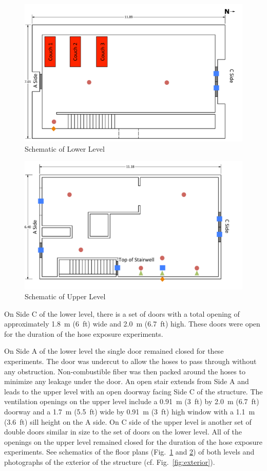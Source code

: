 \documentclass[letterpaper,11pt]{texMemo} %
\begin{document}
\begin{figure}[!ht]
\centering
\includegraphics[width=0.8\columnwidth]{../Figures/Hose_Figures/schematic_lower}
\caption{Schematic of Lower Level}
\label{fig:schematic_low}
\end{figure}

\begin{figure}[!ht]
\centering
\includegraphics[width=0.8\columnwidth]{../Figures/Hose_Figures/schematic_upper}
\caption{Schematic of Upper Level}
\label{fig:schematic_up}
\end{figure}

On Side C of the lower level, there is a set of doors with a total opening of approximately 1.8~m (6~ft) wide and 2.0~m (6.7~ft) high. These doors were open for the duration of the hose exposure experiments.  

On Side A of the lower level the single door remained closed for these experiments. The door was undercut to allow the hoses to pass through without any obstruction. Non-combustible fiber was then packed around the hoses to minimize any leakage under the door.  An open stair extends from Side A and leads to the upper level with an open doorway facing Side C of the structure. The ventilation openings on the upper level include a 0.91~m (3~ft) by 2.0~m (6.7~ft) doorway and a 1.7~m (5.5~ft) wide by 0.91~m (3~ft) high window with a 1.1~m (3.6~ft) sill height on the A side. On C side of the upper level is another set of double doors similar in size to the set of doors on the lower level. All of the openings on the upper level remained closed for the duration of the hose exposure experiments. See schematics of the floor plans (Fig.~\ref{fig:schematic_low} and \ref{fig:schematic_up}) of both levels and photographs of the exterior of the structure (cf. Fig.~\ref{fig:exterior}).
\end{document}
